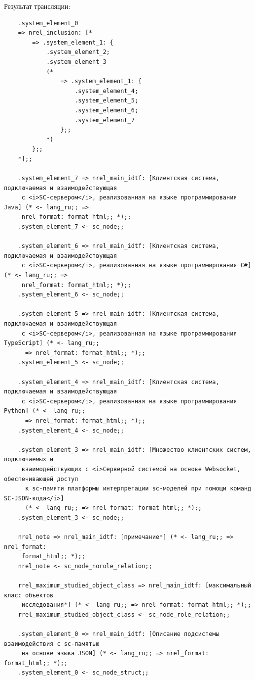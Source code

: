 Результат трансляции:


\begin{verbatim}
	.system_element_0
	=> nrel_inclusion: [*
		=> .system_element_1: {
			.system_element_2;
			.system_element_3
			(*
				=> .system_element_1: {
					.system_element_4;
					.system_element_5;
					.system_element_6;
					.system_element_7
				};;
			*)
		};;
	*];;
	
	.system_element_7 => nrel_main_idtf: [Клиентская система, подключаемая и взаимодействующая
	 с <i>SC-сервером</i>, реализованная на языке программирования Java] (* <- lang_ru;; => 
	 nrel_format: format_html;; *);;
	.system_element_7 <- sc_node;;
	
	.system_element_6 => nrel_main_idtf: [Клиентская система, подключаемая и взаимодействующая
	 с <i>SC-сервером</i>, реализованная на языке программирования C#] (* <- lang_ru;; => 
	 nrel_format: format_html;; *);;
	.system_element_6 <- sc_node;;
	
	.system_element_5 => nrel_main_idtf: [Клиентская система, подключаемая и взаимодействующая
	 с <i>SC-сервером</i>, реализованная на языке программирования TypeScript] (* <- lang_ru;;
	  => nrel_format: format_html;; *);;
	.system_element_5 <- sc_node;;
	
	.system_element_4 => nrel_main_idtf: [Клиентская система, подключаемая и взаимодействующая
	 с <i>SC-сервером</i>, реализованная на языке программирования Python] (* <- lang_ru;;
	  => nrel_format: format_html;; *);;
	.system_element_4 <- sc_node;;
	
	.system_element_3 => nrel_main_idtf: [Множество клиентских систем, подключаемых и
	 взаимодействующих с <i>Серверной системой на основе Websocket, обеспечивающей доступ
	  к sc-памяти платформы интерпретации sc-моделей при помощи команд SC-JSON-кода</i>]
	  (* <- lang_ru;; => nrel_format: format_html;; *);;
	.system_element_3 <- sc_node;;
	
	nrel_note => nrel_main_idtf: [примечание*] (* <- lang_ru;; => nrel_format:
	 format_html;; *);;
	nrel_note <- sc_node_norole_relation;;
	
	rrel_maximum_studied_object_class => nrel_main_idtf: [максимальный класс объектов
	 исследования*] (* <- lang_ru;; => nrel_format: format_html;; *);;
	rrel_maximum_studied_object_class <- sc_node_role_relation;;
	
	.system_element_0 => nrel_main_idtf: [Описание подсистемы взаимодействия c sc-памятью
	 на основе языка JSON] (* <- lang_ru;; => nrel_format: format_html;; *);;
	.system_element_0 <- sc_node_struct;;
	

\end{verbatim}

